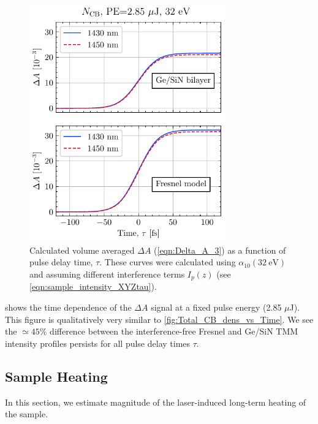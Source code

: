 \begin{figure}
	\centering
	\includegraphics[width=0.75\textwidth]{figures/chap4/FVA_Total_CB_dens_vs_T.pdf}
	\caption{Calculated volume averaged $\Delta A$ (\cref{eqn:Delta_A_3}) as a function of pulse delay time, $\tau$. These curves were calculated using $\alpha_{10}(32 \ \textrm{eV})$ and assuming different interference terms $I_p(z)$ (see \cref{eqn:sample_intensity_XYZtau}).}
	\label{fig:FVA_Total_CB_dens_vs_T}
\end{figure}

 shows the time dependence of the $\Delta A$ signal at a fixed pulse energy (2.85 $\mu$J). This figure is qualitatively very similar to \cref{fig:Total_CB_dens_vs_Time}. We see the $\simeq 45\%$ difference between the interference-free Fresnel and Ge/SiN TMM intensity profiles persists for all pulse delay times $\tau$.

\subsection{Sample Heating}
\label{sec:sample_heating}

In this section, we estimate magnitude of the laser-induced long-term heating of the sample. 

